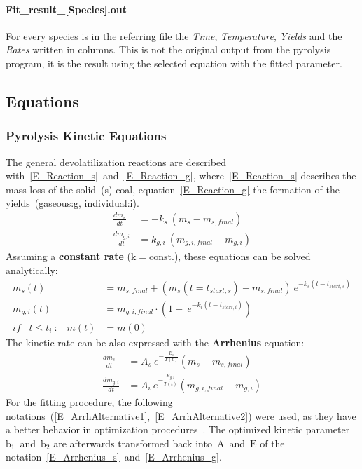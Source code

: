 \paragraph{Fit\_result\_[Species].out}
For every species is in the referring file the \emph{Time}, \emph{Temperature}, \emph{Yields} and the \emph{Rates} written in columns. This is not the original output from the pyrolysis program, it is the result using the selected equation with the fitted parameter.

\subsection{Equations}\label{SS_Eq}
\subsubsection{Pyrolysis Kinetic Equations}\label{SSS_KinEq}
The general devolatilization reactions are described with~\ref{E_Reaction_s}~and~\ref{E_Reaction_g}, where~\ref{E_Reaction_s} describes the mass loss of the solid~(s) coal, equation~\ref{E_Reaction_g} the formation of the yields~(gaseous:g, individual:i).
\begin{align}
\label{E_Reaction_s}
 \frac{dm_{s}}{dt}&=-k_s \: \left( m_{s} - m_{s,final} \right)\\
\label{E_Reaction_g}
 \frac{dm_{g,i}}{dt}&=k_{g,i} \: \left(m_{g,i,final} - m_{g,i}\right)  
\end{align}
Assuming a \textbf{constant rate} ($\mathrm{k = const. }$), these equations can be solved analytically:
\begin{align}
\label{E_constRate_s}
m_s(t)&=m_{s,final} + \left( m_{s}(t=t_{start,s}) - m_{s,final} \right) \: e^{-k_s(t-t_{start,s})}\\
\label{E_constRate_g}
m_{g,i}(t)&=m_{g,i,final}\cdot \left( 1 - \: e^{-k_i(t-t_{start,i})} \right)\\
\label{E_Offset_Time}
if \;\;\; t\leq t_i\::\;\;\; m(t)&=m(0)
\end{align}
The kinetic rate can be also expressed with the \textbf{Arrhenius} equation:
\begin{align}\label{E_Arrhenius_s}
 \frac{dm_s}{dt}&=A_s \: e^{-\frac{E_s}{T(t)}}\left( m_{s} - m_{s,final} \right)\\
\label{E_Arrhenius_g}
 \frac{dm_{g,i}}{dt}&=A_i \:e^{-\frac{E_{g,i}}{T(t)}}\left(m_{g,i,final} - m_{g,i}\right)
\end{align}
For the fitting procedure, the following notations~(\ref{E_ArrhAlternative1},~\ref{E_ArrhAlternative2}) were used, as they have a better behavior in optimization procedures~\cite{Ferraris_1,Ferraris_2}. The optimized kinetic parameter~$\mathrm{b_1}$~and~$\mathrm{b_2}$ are afterwards transformed back into~$\mathrm{A}$~and~$\mathrm{E}$ of the notation~\ref{E_Arrhenius_s}~and~\ref{E_Arrhenius_g}.
